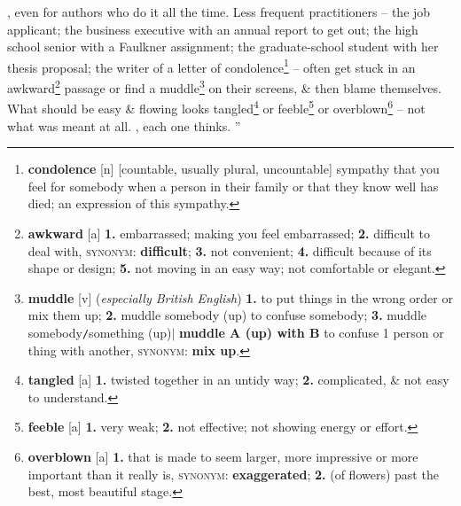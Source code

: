 \documentclass[oneside]{book}
\numberwithin{equation}{section}
\begin{document}
, even for authors who do it all the time. Less frequent practitioners -- the job applicant; the business executive with an annual report to get out; the high school senior with a Faulkner assignment; the graduate-school student with her thesis proposal; the writer of a letter of condolence\footnote{\textbf{condolence} [n] [countable, usually plural, uncountable] sympathy that you feel for somebody when a person in their family or that they know well has died; an expression of this sympathy.} -- often get stuck in an awkward\footnote{\textbf{awkward} [a] \textbf{1.} embarrassed; making you feel embarrassed; \textbf{2.} difficult to deal with, \textsc{synonym}: \textbf{difficult}; \textbf{3.} not convenient; \textbf{4.} difficult because of its shape or design; \textbf{5.} not moving in an easy way; not comfortable or elegant.} passage or find a muddle\footnote{\textbf{muddle} [v] (\textit{especially British English}) \textbf{1.} to put things in the wrong order or mix them up; \textbf{2.} muddle somebody (up) to confuse somebody; \textbf{3.} muddle somebody\texttt{/}something (up)$|$ \textbf{muddle A (up) with B} to confuse 1 person or thing with another, \textsc{synonym}: \textbf{mix up}.} on their screens, \& then blame themselves. What should be easy \& flowing looks tangled\footnote{\textbf{tangled} [a] \textbf{1.} twisted together in an untidy way; \textbf{2.} complicated, \& not easy to understand.} or feeble\footnote{\textbf{feeble} [a] \textbf{1.} very weak; \textbf{2.} not effective; not showing energy or effort.} or overblown\footnote{\textbf{overblown} [a] \textbf{1.} that is made to seem larger, more impressive or more important than it really is, \textsc{synonym}: \textbf{exaggerated}; \textbf{2.} (of flowers) past the best, most beautiful stage.} -- not what was meant at all. , each one thinks. ''
\end{document}
